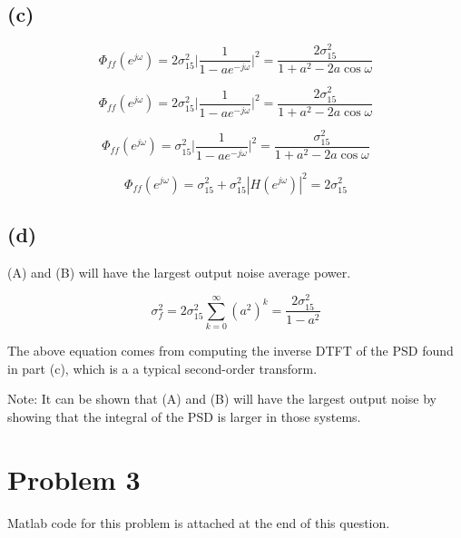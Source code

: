 \documentclass{article}
\begin{document}
\subsection{(c)}

\begin{equation}
\Phi_{ff}(e^{j\omega}) = 2\sigma_{15}^2\bigg|\frac{1}{1-ae^{-j\omega}}\bigg|^2 = \frac{2\sigma_{15}^2}{1 + a^2 - 2a\cos\omega} \tag{(A)}
\end{equation}

\begin{equation}
\Phi_{ff}(e^{j\omega}) = 2\sigma_{15}^2\bigg|\frac{1}{1-ae^{-j\omega}}\bigg|^2 = \frac{2\sigma_{15}^2}{1 + a^2 - 2a\cos\omega} \tag{(B)}
\end{equation}

\begin{equation}
\Phi_{ff}(e^{j\omega}) = \sigma_{15}^2\bigg|\frac{1}{1-ae^{-j\omega}}\bigg|^2 = \frac{\sigma_{15}^2}{1 + a^2 - 2a\cos\omega} \tag{(C)}
\end{equation}

\begin{equation}
\Phi_{ff}(e^{j\omega}) = \sigma_{15}^2 + \sigma_{15}^2|H(e^{j\omega})|^2 = 2\sigma_{15}^2 \tag{(D)}
\end{equation}

\subsection{(d)}

(A) and (B) will have the largest output noise average power.

\begin{equation}
	\sigma_{f}^2 = 2\sigma_{15}^2\sum_{k = 0}^\infty (a^2)^k = \frac{2\sigma_{15}^2}{1 - a^2}
\end{equation}

The above equation comes from computing the inverse DTFT of the PSD found in part (c), which is a a typical second-order transform. 

Note: It can be shown that (A) and (B) will have the largest output noise by showing that the integral of the PSD is larger in those systems. 	
	
\newpage
\section{Problem 3}

Matlab code for this problem is attached at the end of this question.
\end{document}
